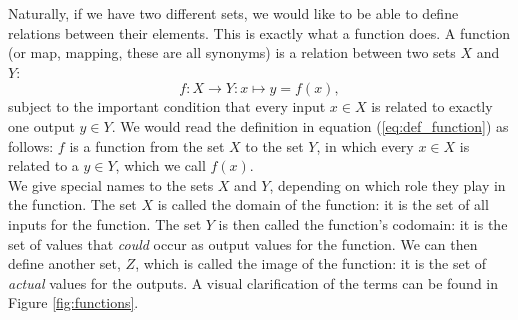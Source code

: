         Naturally, if we have two different sets, we would like to be able to define relations between their elements. This is exactly what a function does. A function (or map, mapping, these are all synonyms) is a relation between two sets $X$ and $Y$:
        \begin{equation} \label{eq:def_function}
            f: X \rightarrow Y: x \mapsto y = f(x) ,
        \end{equation}
        subject to the important condition that every input $x \in X$ is related to exactly one output $y \in Y$. We would read the definition in equation (\ref{eq:def_function}) as follows: $f$ is a function from the set $X$ to the set $Y$, in which every $x \in X$ is related to a $y \in Y$, which we call $f(x)$. \\

        We give special names to the sets $X$ and $Y$, depending on which role they play in the function. The set $X$ is called the domain of the function: it is the set of all inputs for the function. The set $Y$ is then called the function's codomain: it is the set of values that \emph{could} occur as output values for the function. We can then define another set, $Z$, which is called the image of the function: it is the set of \emph{actual} values for the outputs. A visual clarification of the terms can be found in Figure \ref{fig:functions}. \\
